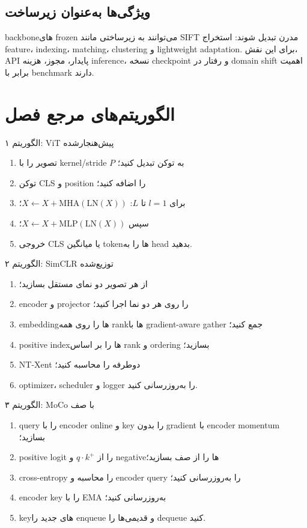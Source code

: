 \documentclass[12pt,openany,oneside]{book}
\begin{document}
\subsection{ویژگی‌ها به‌عنوان زیرساخت}
backboneهای frozen می‌توانند به زیرساختی مانند SIFT مدرن تبدیل شوند: استخراج feature، indexing، matching، clustering و lightweight adaptation. برای این نقش، API پایدار، مجوز، هزینه inference، نسخه checkpoint و رفتار در domain shift اهمیت برابر با benchmark دارند.

\section{الگوریتم‌های مرجع فصل}
\begin{algorithmbox}{الگوریتم ۱: ViT پیش‌هنجارشده}
\begin{enumerate}
\item تصویر را با kernel/stride $P$ به توکن تبدیل کنید؛
\item توکن CLS و position را اضافه کنید؛
\item برای $l=1$ تا $L$: $X\leftarrow X+\mathrm{MHA}(\mathrm{LN}(X))$؛
\item سپس $X\leftarrow X+\mathrm{MLP}(\mathrm{LN}(X))$؛
\item خروجی CLS یا میانگین tokenها را به head بدهید.
\end{enumerate}
\end{algorithmbox}

\begin{algorithmbox}{الگوریتم ۲: SimCLR توزیع‌شده}
\begin{enumerate}
\item از هر تصویر دو نمای مستقل بسازید؛
\item encoder و projector را روی هر دو نما اجرا کنید؛
\item embeddingها را روی همه rankها با gradient-aware gather جمع کنید؛
\item positive indexها را بر اساس rank و ordering بسازید؛
\item NT-Xent دوطرفه را محاسبه کنید؛
\item optimizer، scheduler و logger را به‌روزرسانی کنید.
\end{enumerate}
\end{algorithmbox}

\begin{algorithmbox}{الگوریتم ۳: MoCo با صف}
\begin{enumerate}
\item query را با encoder online و key را بدون gradient با encoder momentum بسازید؛
\item positive logit را از $q\cdot k^+$ و negativeها را از صف بسازید؛
\item cross-entropy را محاسبه و encoder query را به‌روزرسانی کنید؛
\item encoder key را با EMA به‌روزرسانی کنید؛
\item keyهای جدید را enqueue و قدیمی‌ها را dequeue کنید.
\end{enumerate}
\end{algorithmbox}
\end{document}
